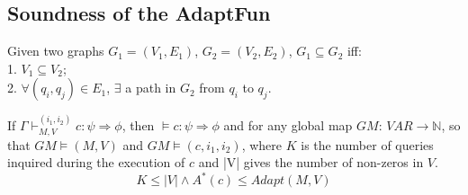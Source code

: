 \documentclass[a4paper,11pt]{article}
\newcommand{\THESYSTEM}{\textsf{AdaptFun}}
\begin{document}
\subsection{Soundness of the \THESYSTEM}
\begin{defn}
[Subgraph]
Given two graphs $G_1 = (V_1, E_1)$, $G_2 = (V_2, E_2)$, $G_1 \subseteq G_2$ iff:
\\
1. $V_1 \subseteq V_2$;
\\
2. $\forall (q_i, q_j) \in E_1$, $\exists $ a path in $G_2$ from $q_i$ to $q_j$.
\end{defn}
%
%
\begin{thm}
If $ \Gamma \vdash_{M,V}^{(i_1,i_2)} c : \psi \Rightarrow \phi$, then $\vDash c : \psi \Rightarrow \phi $ and for any global map $GM$: $VAR \to \mathbb{N} $, so that $GM \vDash (M,V)$ and $GM \vDash (c, i_1, i_2)$, where $K$ is the number of queries inquired during the execution of $c$ and |V| gives the number of non-zeros in $V$. 
\[
K \leq |V| \land  A^{*}(c) \leq Adapt(M, V)
\]      
\end{thm}
\end{document}
